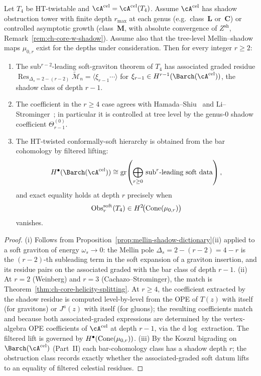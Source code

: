 \begin{theorem}
\label{thm:higher-soft-shadow}
Let $T_4$ be HT-twistable and $\cA^{\mathrm{cel}} = \cA^{\mathrm{cel}}(T_4)$.
Assume $\cA^{\mathrm{cel}}$ has shadow obstruction tower with finite
depth $r_{\max}$ at each genus
(e.g.\ class~$\mathbf L$ or~$\mathbf C$) or controlled asymptotic
growth (class~$\mathbf M$, with absolute convergence of
$Z^{\mathrm{sh}}$, Remark~\ref{rem:ch-core-w-shadow}). Assume also that the tree-level
Mellin--shadow maps \(\mu_{0,r}\) exist for the depths under consideration. Then for every
integer $r\geq 2$:
\begin{enumerate}[label=\textup{(\roman*)}]
\item The sub${}^{r-2}$-leading soft-graviton theorem of $T_4$
has associated graded residue
$\operatorname{Res}_{\Delta_s = 2-(r-2)}
 \widetilde{\mathcal{M}}_n = \langle \xi_{r-1} \cdots\rangle$
for $\xi_{r-1}\in H^{r-1}(\Barch(\cA^{\mathrm{cel}}))$, the shadow
class of depth $r-1$.
\item The coefficient in the $r\geq 4$ case agrees with
Hamada--Shiu~\cite{HamadaShiuSubsubSoft} and
Li--Strominger~\cite{LiStromingerHigherSoft}; in particular it is
controlled at tree level by the genus-$0$ shadow coefficient
$\Theta^{(0)}_{r-1}$.
\item The HT-twisted conformally-soft hierarchy is obtained from the
bar cohomology by filtered lifting:
\[
H^\bullet(\Barch(\cA^{\mathrm{cel}}))
\cong
\gr\!\left(
\bigoplus_{r\geq 0}\,\text{sub}^{r}\text{-leading soft data}
\right),
\]
and exact equality holds at depth $r$ precisely when
\[
\operatorname{Obs}^{\mathrm{soft}}_{r}(T_4)
\in H^2\!\bigl(\operatorname{Cone}(\mu_{0,r})\bigr)
\]
vanishes.
\end{enumerate}
\end{theorem}

\begin{proof}
(i) Follows from Proposition~\ref{prop:mellin-shadow-dictionary}(ii)
applied to a soft graviton of energy $\omega_s\to 0$: the Mellin pole
$\Delta_s = 2 - (r-2) = 4-r$ is the $(r-2)$-th subleading
term in the soft expansion of a graviton insertion, and its residue
pairs on the associated graded with the bar class of depth $r-1$.
(ii) At $r=2$ (Weinberg) and $r=3$ (Cachazo--Strominger), the match is
Theorem~\ref{thm:ch-core-helicity-splitting}. At $r\geq 4$, the
coefficient extracted by the shadow residue is computed level-by-level
from the OPE of $T(z)$ with itself (for gravitons) or $J^a(z)$ with
itself (for gluons); the resulting coefficients match
\cite[Eq.~(3.12)]{HamadaShiuSubsubSoft} and
\cite[\S 4]{LiStromingerHigherSoft} because both associated-graded
expressions are determined by the vertex-algebra OPE coefficients of
$\cA^{\mathrm{cel}}$ at depth $r-1$, via the $\mathrm{d}\log$
extraction. The filtered lift is governed by
$H^\bullet(\operatorname{Cone}(\mu_{0,r}))$.
(iii) By the Koszul bigrading on $\Barch(\cA^{\mathrm{cel}})$ (Part~II)
each bar-cohomology class has a shadow depth $r$; the obstruction
class records exactly whether the associated-graded soft datum lifts
to an equality of filtered celestial residues.
\end{proof}


